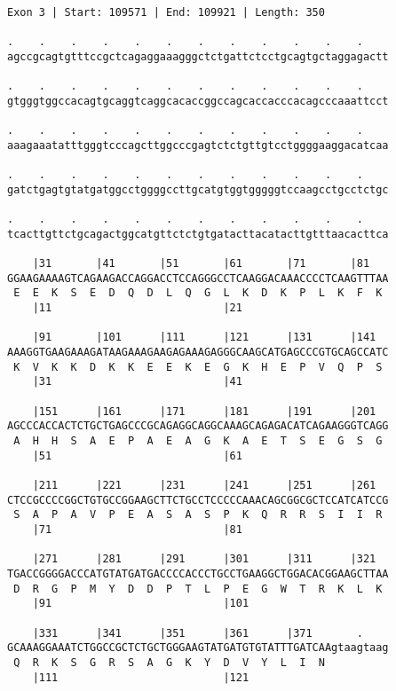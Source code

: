\documentclass{article}
\begin{document}
\begin{Verbatim}
Exon 3 | Start: 109571 | End: 109921 | Length: 350
 
.    .    .    .    .    .    .    .    .    .    .    .    
agccgcagtgtttccgctcagaggaaagggctctgattctcctgcagtgctaggagactt
  
.    .    .    .    .    .    .    .    .    .    .    .    
gtgggtggccacagtgcaggtcaggcacaccggccagcaccacccacagcccaaattcct
  
.    .    .    .    .    .    .    .    .    .    .    .    
aaagaaatatttgggtcccagcttggcccgagtctctgttgtcctggggaaggacatcaa
  
.    .    .    .    .    .    .    .    .    .    .    .    
gatctgagtgtatgatggcctggggccttgcatgtggtgggggtccaagcctgcctctgc
  
.    .    .    .    .    .    .    .    .    .    .    .    
tcacttgttctgcagactggcatgttctctgtgatacttacatacttgtttaacacttca
  
    |31       |41       |51       |61       |71       |81   
GGAAGAAAAGTCAGAAGACCAGGACCTCCAGGGCCTCAAGGACAAACCCCTCAAGTTTAA
 E  E  K  S  E  D  Q  D  L  Q  G  L  K  D  K  P  L  K  F  K 
    |11                           |21                       
  
    |91       |101      |111      |121      |131      |141  
AAAGGTGAAGAAAGATAAGAAAGAAGAGAAAGAGGGCAAGCATGAGCCCGTGCAGCCATC
 K  V  K  K  D  K  K  E  E  K  E  G  K  H  E  P  V  Q  P  S 
    |31                           |41                       
  
    |151      |161      |171      |181      |191      |201  
AGCCCACCACTCTGCTGAGCCCGCAGAGGCAGGCAAAGCAGAGACATCAGAAGGGTCAGG
 A  H  H  S  A  E  P  A  E  A  G  K  A  E  T  S  E  G  S  G 
    |51                           |61                       
  
    |211      |221      |231      |241      |251      |261  
CTCCGCCCCGGCTGTGCCGGAAGCTTCTGCCTCCCCCAAACAGCGGCGCTCCATCATCCG
 S  A  P  A  V  P  E  A  S  A  S  P  K  Q  R  R  S  I  I  R 
    |71                           |81                       
  
    |271      |281      |291      |301      |311      |321  
TGACCGGGGACCCATGTATGATGACCCCACCCTGCCTGAAGGCTGGACACGGAAGCTTAA
 D  R  G  P  M  Y  D  D  P  T  L  P  E  G  W  T  R  K  L  K 
    |91                           |101                      
  
    |331      |341      |351      |361      |371       .    
GCAAAGGAAATCTGGCCGCTCTGCTGGGAAGTATGATGTGTATTTGATCAAgtaagtaag
 Q  R  K  S  G  R  S  A  G  K  Y  D  V  Y  L  I  N          
    |111                          |121                      
  

\end{Verbatim}
\end{document}

